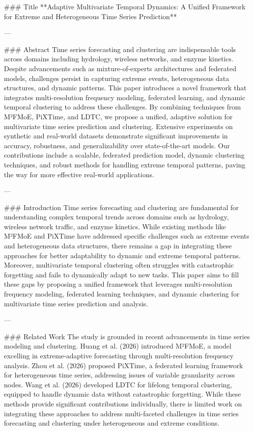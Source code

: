 ### Title  
**Adaptive Multivariate Temporal Dynamics: A Unified Framework for Extreme and Heterogeneous Time Series Prediction**

---

### Abstract  
Time series forecasting and clustering are indispensable tools across domains including hydrology, wireless networks, and enzyme kinetics. Despite advancements such as mixture-of-experts architectures and federated models, challenges persist in capturing extreme events, heterogeneous data structures, and dynamic patterns. This paper introduces a novel framework that integrates multi-resolution frequency modeling, federated learning, and dynamic temporal clustering to address these challenges. By combining techniques from M²FMoE, PiXTime, and LDTC, we propose a unified, adaptive solution for multivariate time series prediction and clustering. Extensive experiments on synthetic and real-world datasets demonstrate significant improvements in accuracy, robustness, and generalizability over state-of-the-art models. Our contributions include a scalable, federated prediction model, dynamic clustering techniques, and robust methods for handling extreme temporal patterns, paving the way for more effective real-world applications.

---

### Introduction  
Time series forecasting and clustering are fundamental for understanding complex temporal trends across domains such as hydrology, wireless network traffic, and enzyme kinetics. While existing methods like M²FMoE and PiXTime have addressed specific challenges such as extreme events and heterogeneous data structures, there remains a gap in integrating these approaches for better adaptability to dynamic and extreme temporal patterns. Moreover, multivariate temporal clustering often struggles with catastrophic forgetting and fails to dynamically adapt to new tasks. This paper aims to fill these gaps by proposing a unified framework that leverages multi-resolution frequency modeling, federated learning techniques, and dynamic clustering for multivariate time series prediction and analysis.

---

### Related Work  
The study is grounded in recent advancements in time series modeling and clustering. Huang et al. (2026) introduced M²FMoE, a model excelling in extreme-adaptive forecasting through multi-resolution frequency analysis. Zhou et al. (2026) proposed PiXTime, a federated learning framework for heterogeneous time series, addressing issues of variable granularity across nodes. Wang et al. (2026) developed LDTC for lifelong temporal clustering, equipped to handle dynamic data without catastrophic forgetting. While these methods provide significant contributions individually, there is limited work on integrating these approaches to address multi-faceted challenges in time series forecasting and clustering under heterogeneous and extreme conditions.

